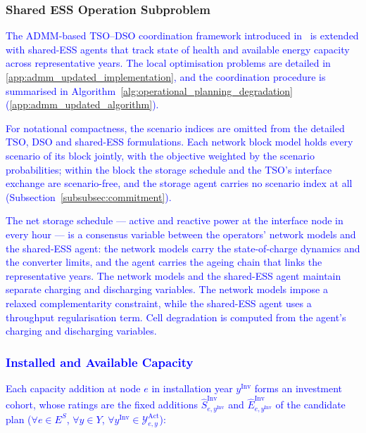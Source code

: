 \documentclass[preprint,12pt]{elsarticle}
\begin{document}
\subsubsection{Shared ESS Operation Subproblem}

\textcolor{blue}{
    The ADMM-based TSO--DSO coordination framework introduced in~\cite{simoes_2023} is extended with shared-ESS agents that track state of health and available energy capacity across representative years. The local optimisation problems are detailed in \ref{app:admm_updated_implementation}, and the coordination procedure is summarised in Algorithm~\ref{alg:operational_planning_degradation} (\ref{app:admm_updated_algorithm}).
}

\textcolor{blue}{
    For notational compactness, the scenario indices are omitted from the detailed TSO, DSO and shared-ESS formulations. Each network block model holds every scenario of its block jointly, with the objective weighted by the scenario probabilities; within the block the storage schedule and the TSO's interface exchange are scenario-free, and the storage agent carries no scenario index at all (Subsection~\ref{subsubsec:commitment}).
}

\textcolor{blue}{
    The net storage schedule --- active and reactive power at the interface node in every hour --- is a consensus variable between the operators' network models and the shared-ESS agent: the network models carry the state-of-charge dynamics and the converter limits, and the agent carries the ageing chain that links the representative years. 
    The network models and the shared-ESS agent maintain separate charging and discharging variables. The network models impose a relaxed complementarity constraint, while the shared-ESS agent uses a throughput regularisation term. Cell degradation is computed from the agent's charging and discharging variables.
}

\subsubsection{\textcolor{blue}{Installed and Available Capacity}}
\label{subsubsec:capacity}

\textcolor{blue}{
    Each capacity addition at node $e$ in installation year $y^{\text{Inv}}$ forms an investment cohort, whose ratings are the fixed additions $\hat{S}^{\text{Inv}}_{e,y^{\text{Inv}}}$ and $\hat{E}^{\text{Inv}}_{e,y^{\text{Inv}}}$ of the candidate plan ($\forall e\in E^S$, $\forall y\in Y$, $\forall y^{\text{Inv}}\in\mathcal{Y}^{\text{Act}}_{e,y}$):
}
\end{document}
